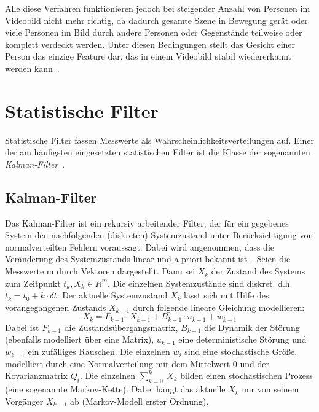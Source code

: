 \documentclass[a4paper, 11pt, twocolumn]{article}
\begin{document}
Alle diese Verfahren funktionieren jedoch bei steigender Anzahl von Personen im Videobild nicht mehr richtig, da dadurch gesamte Szene in Bewegung gerät oder viele Personen im Bild durch andere Personen oder Gegenstände teilweise oder komplett verdeckt werden. Unter diesen Bedingungen stellt das Gesicht einer Person das einzige Feature dar, das in einem Videobild stabil wiedererkannt werden kann~\cite{aliMultipleHuman}.


\section{Statistische Filter} %
\label{sec:statistische_filter}

Statistische Filter fassen Messwerte als Wahrscheinlichkeitsverteilungen auf. 
Einer der am häufigsten eingesetzten statistischen Filter ist die Klasse der sogenannten \emph{Kalman-Filter}~\cite{MarslandBook}.


\subsection{Kalman-Filter} %
\label{sub:kalman_filter}

Das Kalman-Filter ist ein rekursiv arbeitender Filter, der für ein gegebenes System den nachfolgenden (diskreten) Systemzustand unter Berücksichtigung von normalverteilten Fehlern voraussagt. Dabei wird angenommen, dass die Veränderung des Systemzustands linear und a-priori bekannt ist~\cite{Welch1995}. Seien die Messwerte m durch Vektoren dargestellt. Dann sei $X_k$ der Zustand des Systems zum Zeitpunkt $t_k, X_k \in R^m$. Die einzelnen Systemzustände sind diskret, d.h. $t_k = t_0 + k \cdot \delta t$. Der aktuelle Systemzustand $X_k$ lässt sich mit Hilfe des vorangegangenen Zustands $X_{k-1}$ durch folgende lineare Gleichung modellieren:
\[
	X_k = F_{k-1} \cdot X_{k-1} + B_{k-1} \cdot u_{k-1} + w_{k-1}
\]
Dabei ist $F_{k-1}$ die Zustandsübergangsmatrix, $B_{k-1}$ die Dynamik der Störung (ebenfalls modelliert über eine Matrix), $u_{k-1}$ eine deterministische Störung und $w_{k-1}$ ein zufälliges Rauschen. Die einzelnen $w_i$ sind eine stochastische Größe, modelliert durch eine Normalverteilung mit dem Mittelwert 0 und der Kovarianzmatrix $Q_i$. Die einzelnen $\sum_{k=0}^k~X_k$ bilden einen stochastischen Prozess (eine sogenannte Markov-Kette). Dabei hängt das aktuelle $X_k$ nur von seinem Vorgänger $X_{k-1}$ ab (Markov-Modell erster Ordnung).
\end{document}
